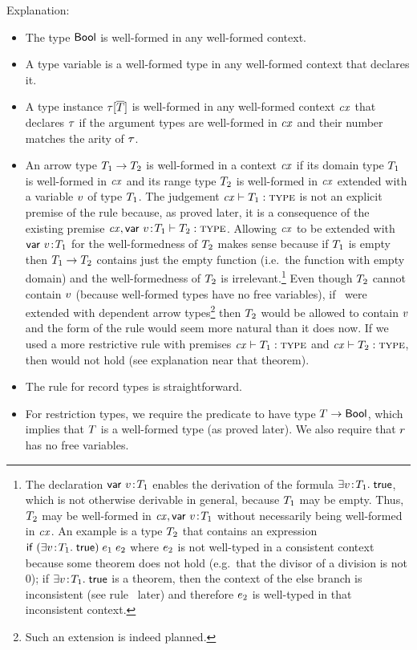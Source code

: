 Explanation:
\begin{itemize}
\item
The type $\mathsf{Bool}$ is well-formed in any well-formed context.
\item
A type variable is a well-formed type in any well-formed context that declares
it.
\item
A type instance $\tau[\overline{T}]$ is well-formed in any well-formed context $\mathit{cx}$ that
declares $\tau$ if the argument types are well-formed in $\mathit{cx}$ and their number
matches the arity of $\tau$.
\item
An arrow type $T_1\to T_2$ is well-formed in a context $\mathit{cx}$ if its domain type
$T_1$ is well-formed in $\mathit{cx}$ and its range type $T_2$ is well-formed in
$\mathit{cx}$ extended with a variable $v$ of type $T_1$. The judgement
$\mathit{cx}\vdash T_1:\textsc{type}$ is not an explicit premise of the rule because, as proved
later, it is a consequence of the existing premise
$\mathit{cx},\mathsf{var}\ v\!:\!T_1\vdash T_2:\textsc{type}$. Allowing $\mathit{cx}$ to be extended
with $\mathsf{var}\ v\!:\!T_1$ for the well-formedness of $T_2$ makes sense
because if $T_1$ is empty then $T_1\to T_2$ contains just the empty function
(i.e.\ the function with empty domain) and the well-formedness of $T_2$ is
irrelevant.\footnote{The declaration $\mathsf{var}\ v\!:\!T_1$ enables the
derivation of the formula $\exists v\!:\!T_1.\;\mathsf{true}$, which is not otherwise
derivable in general, because $T_1$ may be empty. Thus, $T_2$ may be
well-formed in $\mathit{cx},\mathsf{var}\ v\!:\!T_1$ without necessarily being
well-formed in $\mathit{cx}$. An example is a type $T_2$ that contains an expression
$\mathsf{if}\;(\exists v\!:\!T_1.\;\mathsf{true})\;e_1\;e_2$ where $e_2$ is not
well-typed in a consistent context because some theorem does not hold (e.g.\
that the divisor of a division is not 0); if $\exists v\!:\!T_1.\;\mathsf{true}$ is a
theorem, then the context of the else branch is inconsistent (see rule \Reif\
later) and therefore $e_2$ is well-typed in that inconsistent context.} Even
though $T_2$ cannot contain $v$ (because well-formed types have no free
variables), if \MS\ were extended with dependent arrow types\footnote{Such an
extension is indeed planned.} then $T_2$ would be allowed to contain $v$
and the form of the rule would seem more natural than it does now. If we used a
more restrictive rule with premises $\mathit{cx}\vdash T_1:\textsc{type}$ and $\mathit{cx}\vdash T_2:\textsc{type}$, then
\thmref{thm-exty-wf} would not hold (see explanation near that theorem).
\item
The rule for record types is straightforward.
\item
For restriction types, we require the predicate to have type
$T\to\mathsf{Bool}$, which implies that $T$ is a well-formed type (as proved
later). We also require that $r$ has no free variables.
\end{itemize}


